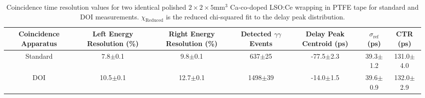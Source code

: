 \begin{table}
\caption{\label{tab:referencevals} Coincidence time resolution values for two identical polished $2\times2\times5$mm$^3$ Ca-co-doped LSO:Ce wrapping in PTFE tape for standard and DOI measurements. $\chi_\text{Reduced}$ is the reduced chi-squared fit to the delay peak distribution.}
\begin{tabular}{ccccccc}
Coincidence Apparatus & Left Energy Resolution (\%) & Right Energy Resolution (\%) & Detected $\gamma\gamma$ Events & Delay Peak Centroid (ps) & $\sigma_\textrm{ref}$ (ps) & CTR (ps)\\
\hline
Standard &   7.8$\pm$0.1 &   9.8$\pm$0.1 &   637$\pm$25 &  -77.5$\pm$2.3 &   39.3$\pm$1.2 &  131.0$\pm$4.0 \\
     DOI &  10.5$\pm$0.1 &  12.7$\pm$0.1 &  1498$\pm$39 &  -14.0$\pm$1.5 &   39.6$\pm$0.9 &  132.0$\pm$2.9 \\
\hline
\end{tabular}
\end{table}
